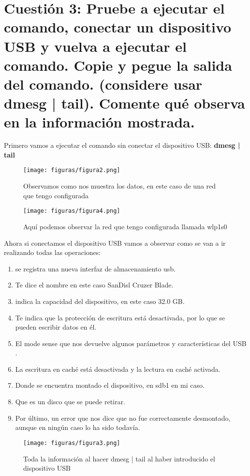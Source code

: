 \section{Cuestión 3: Pruebe a ejecutar el comando, conectar un dispositivo USB y vuelva a ejecutar el comando. Copie y pegue la salida del comando. (considere usar dmesg | tail). Comente qué observa en la información mostrada.}
Primero vamos a ejecutar el comando sin conectar el dispositivo USB:
\textbf{dmesg | tail}\\
\begin{figure}[H] %
	\centering
	\texttt{[image: figuras/figura2.png]}  %
	\label{figura2}
	
	\caption{Observamos como nos muestra los datos, en este caso de una red que tengo configurada } 
\end{figure}

\begin{figure}[H] %
	\centering
	\texttt{[image: figuras/figura4.png]}  %
	\label{figura4}
	
	\caption{Aquí podemos observar la red que tengo configurada llamada wlp1s0} 
\end{figure}

Ahora si conectamos el dispositivo USB vamos a observar como se van a ir realizando todas las operaciones:
\begin{enumerate}
	\item se registra una nueva interfaz de almacenamiento usb.
	\item Te dice el nombre en este caso SanDisl Cruzer Blade.
	\item indica la capacidad del dispositivo, en este caso 32.0 GB.
	\item Te indica que la protección de escritura está desactivada, por lo que se pueden escribir datos en él.
	\item El mode sense que nos devuelve algunos parámetros y características del USB \cite{modesense}.
	\item La escritura en caché está desactivada y la lectura en caché activada.
	\item Donde se encuentra montado el dispositivo, en sdb1 en mi caso.
	\item Que es un disco que se puede retirar.
	\item Por último, un error que nos dice que no fue correctamente desmontado, aunque en ningún caso lo ha sido todavía.
\end{enumerate}
\begin{figure}[H] %
	\centering
	\texttt{[image: figuras/figura3.png]}  %
	\label{figura3}
	
	\caption{Toda la información al hacer dmesg | tail al haber introducido el dispositivo USB} 
\end{figure}

